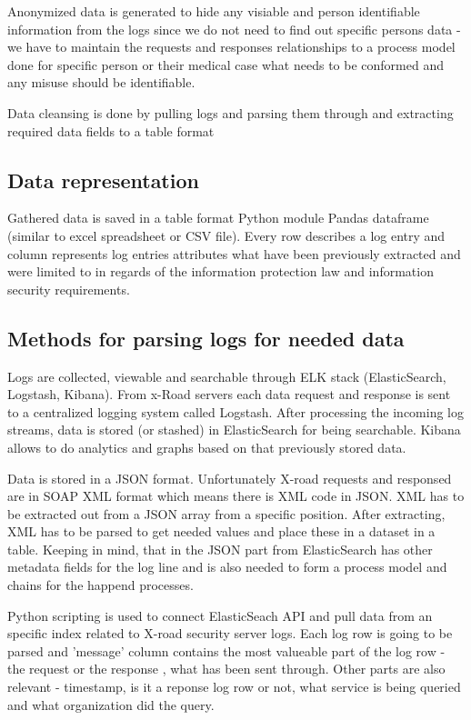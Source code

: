 \documentclass[a4paper, 12pt]{article}
\begin{document}
Anonymized data is generated to hide any visiable and person identifiable information from the logs since we do not need to find out specific persons data - we have to maintain the requests and responses relationships to a process model done for specific person or their medical case what needs to be conformed and any misuse should be identifiable. 

Data cleansing is done by pulling logs and parsing them through and extracting required data fields to a table format 

\subsection{Data representation}
Gathered data is saved in a table format Python module Pandas dataframe (similar to excel spreadsheet or CSV file). Every row describes a log entry and column represents log entries attributes what have been previously extracted and were limited to in regards of the information protection law and information security requirements. 

\subsection{Methods for parsing logs for needed data}
Logs are collected, viewable and searchable through ELK stack (ElasticSearch, Logstash, Kibana). From x-Road servers each data request and response is sent to a centralized logging system called Logstash. After processing the incoming log streams, data is stored (or stashed) in ElasticSearch for being searchable. Kibana allows to do analytics and graphs based on that previously stored data. 

Data is stored in a JSON format. Unfortunately X-road requests and responsed are in SOAP XML format which means there is XML code in JSON. XML has to be extracted out from a JSON array from a specific position. After extracting, XML has to be parsed to get needed values and place these in a dataset in a table. Keeping in mind, that in the JSON part from ElasticSearch has other metadata fields for the log line and is also needed to form a process model and chains for the happend processes. 

Python scripting is used to connect ElasticSeach API and pull data from an specific index related to X-road security server logs. Each log row is going to be parsed and 'message' column contains the most valueable part of the log row -  the request or the response , what has been sent through. Other parts are also relevant - timestamp, is it a reponse log row or not, what service is being queried and what organization did the query. 
\end{document}
